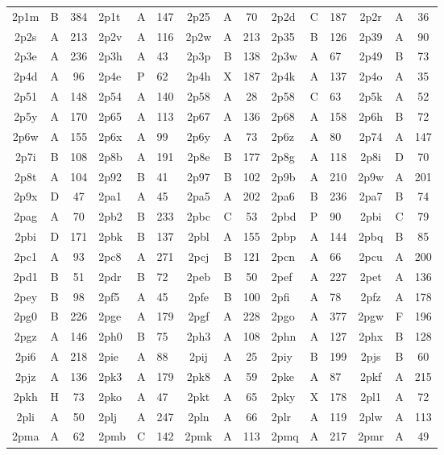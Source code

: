 \begin{longtable}{|c|c|c| a|a|a| c|c|c| a|a|a| c|c|c|}
2p1m & B & 384 & 2p1t & A & 147 & 2p25 & A & 70 & 2p2d & C & 187 & 2p2r & A & 36\\
2p2s & A & 213 & 2p2v & A & 116 & 2p2w & A & 213 & 2p35 & B & 126 & 2p39 & A & 90\\
2p3e & A & 236 & 2p3h & A & 43 & 2p3p & B & 138 & 2p3w & A & 67 & 2p49 & B & 73\\
2p4d & A & 96 & 2p4e & P & 62 & 2p4h & X & 187 & 2p4k & A & 137 & 2p4o & A & 35\\
2p51 & A & 148 & 2p54 & A & 140 & 2p58 & A & 28 & 2p58 & C & 63 & 2p5k & A & 52\\
2p5y & A & 170 & 2p65 & A & 113 & 2p67 & A & 136 & 2p68 & A & 158 & 2p6h & B & 72\\
2p6w & A & 155 & 2p6x & A & 99 & 2p6y & A & 73 & 2p6z & A & 80 & 2p74 & A & 147\\
2p7i & B & 108 & 2p8b & A & 191 & 2p8e & B & 177 & 2p8g & A & 118 & 2p8i & D & 70\\
2p8t & A & 104 & 2p92 & B & 41 & 2p97 & B & 102 & 2p9b & A & 210 & 2p9w & A & 201\\
2p9x & D & 47 & 2pa1 & A & 45 & 2pa5 & A & 202 & 2pa6 & B & 236 & 2pa7 & B & 74\\
2pag & A & 70 & 2pb2 & B & 233 & 2pbc & C & 53 & 2pbd & P & 90 & 2pbi & C & 79\\
2pbi & D & 171 & 2pbk & B & 137 & 2pbl & A & 155 & 2pbp & A & 144 & 2pbq & B & 85\\
2pc1 & A & 93 & 2pc8 & A & 271 & 2pcj & B & 121 & 2pcn & A & 66 & 2pcu & A & 200\\
2pd1 & B & 51 & 2pdr & B & 72 & 2peb & B & 50 & 2pef & A & 227 & 2pet & A & 136\\
2pey & B & 98 & 2pf5 & A & 45 & 2pfe & B & 100 & 2pfi & A & 78 & 2pfz & A & 178\\
2pg0 & B & 226 & 2pge & A & 179 & 2pgf & A & 228 & 2pgo & A & 377 & 2pgw & F & 196\\
2pgz & A & 146 & 2ph0 & B & 75 & 2ph3 & A & 108 & 2phn & A & 127 & 2phx & B & 128\\
2pi6 & A & 218 & 2pie & A & 88 & 2pij & A & 25 & 2piy & B & 199 & 2pjs & B & 60\\
2pjz & A & 136 & 2pk3 & A & 179 & 2pk8 & A & 59 & 2pke & A & 87 & 2pkf & A & 215\\
2pkh & H & 73 & 2pko & A & 47 & 2pkt & A & 65 & 2pky & X & 178 & 2pl1 & A & 72\\
2pli & A & 50 & 2plj & A & 247 & 2pln & A & 66 & 2plr & A & 119 & 2plw & A & 113\\
2pma & A & 62 & 2pmb & C & 142 & 2pmk & A & 113 & 2pmq & A & 217 & 2pmr & A & 49\\

\end{longtable}
